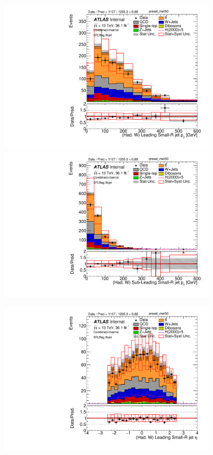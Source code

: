 \begin{figure}[!ht]
\begin{center}
\includegraphics[scale=0.33]{./figures/boosted/PlotsInMbbSR/Unblinded/DataMC_2tag_0bjet_SR_lepton_presel_met50_LightJet1Pt}
\includegraphics[scale=0.33]{./figures/boosted/PlotsInMbbSR/Unblinded/DataMC_2tag_0bjet_SR_lepton_presel_met50_LightJet2Pt}\\
\par\medskip
\includegraphics[scale=0.33]{./figures/boosted/PlotsInMbbSR/Unblinded/DataMC_2tag_0bjet_SR_lepton_presel_met50_LightJet1Eta}

\end{center}
\end{figure}
